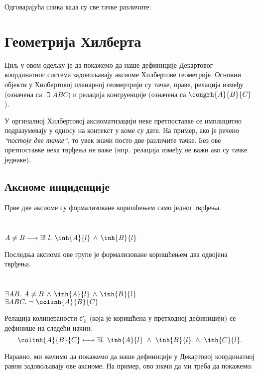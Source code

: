Одговарајућа слика када су све тачке различите:

\begin{center}

\end{center}


\section{Геометрија Хилберта}
\label{sec:hilbert}

Циљ у овом одељку је да покажемо да наше дефиниције Декартовог
координатног система задовољавају аксиоме Хилбертове
геометрије. Основни објекти у Хилбертовој планарној геомертрији су
тачке, праве, релација између (означена са $\beth{A}{B}{C}$) и
релација конгруенције (означена са $\congrh{A}{B}{C}$).


У оргиналној Хилбертовој аксиоматизацији \cite{hilbert} неке
претпоставке се имплицитно подразумевају у односу на контекст у коме
су дате. На пример, ако је речено \emph{``постоје две тачке``}, то
увек значи посто две различите тачке. Без ове претпоставке нека
тврђења не важе (нпр.~релација између не важи ако су тачке једнаке).


\subsection{Аксиоме инциденције}

Прве две аксиоме су формализоване коришћењем само једног тврђења.
{\tt
\begin{tabbing}
$A \neq B \longrightarrow \exists!\ l.\ \inh{A}{l} \,\wedge\, \inh{B}{l}$
\end{tabbing}
}

Последња аксиома ове групе је формализоване коришћењем два одвојена
тврђења.
{\tt
\begin{tabbing}
$\exists A B.\ A \neq B \,\wedge\,\inh{A}{l} \,\wedge\, \inh{B}{l}$\\
$\exists A B C.\ \neg\ \colinh{A}{B}{C}$
\end{tabbing}
}
\noindent Релација колинераности $\mathcal{C}_h$ (која је коришћена у
претходној дефиницији) се дефинише на следећи начин:
$$\colinh{A}{B}{C} \longleftrightarrow \exists
l.\ \inh{A}{l}\ \wedge\ \inh{B}{l}\ \wedge \ \inh{C}{l}.$$

Наравно, ми желимо да покажемо да наше дефиниције у Декартовој
координатној равни задовољавају ове аксиоме. На пример, ово значи да
ми треба да покажемо:

